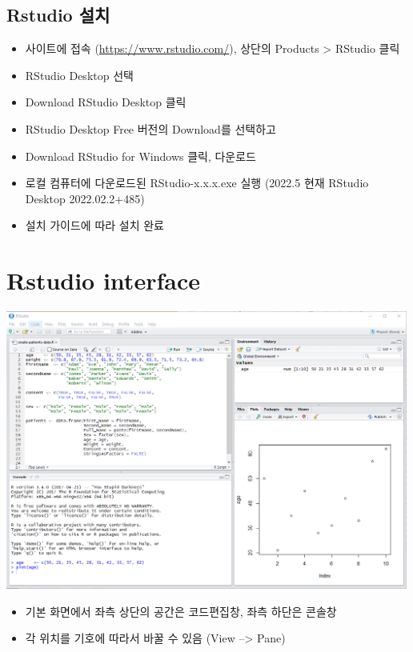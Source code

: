\documentclass[
]{book}
\providecommand{\tightlist}{%
  \setlength{\itemsep}{0pt}\setlength{\parskip}{0pt}}
\begin{document}
\hypertarget{rstudio-uxc124uxce58}{%
\subsection{Rstudio 설치}\label{rstudio-uxc124uxce58}}

\begin{itemize}
\tightlist
\item
  사이트에 접속 (\url{https://www.rstudio.com/}), 상단의 Products \textgreater{} RStudio 클릭
\item
  RStudio Desktop 선택
\item
  Download RStudio Desktop 클릭
\item
  RStudio Desktop Free 버전의 Download를 선택하고
\item
  Download RStudio for Windows 클릭, 다운로드
\item
  로컬 컴퓨터에 다운로드된 RStudio-x.x.x.exe 실행 (2022.5 현재 RStudio Desktop 2022.02.2+485)
\item
  설치 가이드에 따라 설치 완료
\end{itemize}

\hypertarget{rstudio-interface}{%
\section{Rstudio interface}\label{rstudio-interface}}

\includegraphics[width=5.20833in,height=\textheight]{images/01/01-11.PNG}

\begin{itemize}
\tightlist
\item
  기본 화면에서 좌측 상단의 공간은 코드편집창, 좌측 하단은 콘솔창
\item
  각 위치를 기호에 따라서 바꿀 수 있음 (View --\textgreater{} Pane)
\end{itemize}
\end{document}

